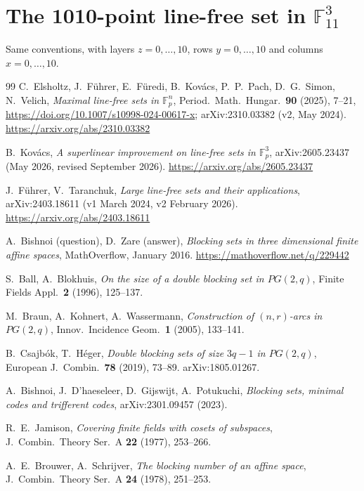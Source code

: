 \documentclass[11pt]{article}
\numberwithin{equation}{section}
\theoremstyle{definition}
\theoremstyle{remark}
\newcommand{\F}{\mathbb F}
\begin{document}
\section{The 1010-point line-free set in \texorpdfstring{$\F_{11}^3$}{F11^3}}\label{app:set11}
Same conventions, with layers $z=0,\dots,10$, rows $y=0,\dots,10$ and columns $x=0,\dots,10$.
{\footnotesize

}

\begin{thebibliography}{99}
C.~Elsholtz, J.~F\"uhrer, E.~F\"uredi, B.~Kov\'acs, P.~P.~Pach, D.~G.~Simon, N.~Velich,
\emph{Maximal line-free sets in $\mathbb F_p^n$}, Period.\ Math.\ Hungar.\ \textbf{90} (2025),
7--21, \url{https://doi.org/10.1007/s10998-024-00617-x}; arXiv:2310.03382 (v2, May 2024).
\url{https://arxiv.org/abs/2310.03382}

B.~Kov\'acs, \emph{A superlinear improvement on line-free sets in $\mathbb F_p^3$},
arXiv:2605.23437 (May 2026, revised September 2026). \url{https://arxiv.org/abs/2605.23437}

J.~F\"uhrer, V.~Taranchuk, \emph{Large line-free sets and their applications},
arXiv:2403.18611 (v1 March 2024, v2 February 2026). \url{https://arxiv.org/abs/2403.18611}

A.~Bishnoi (question), D.~Zare (answer), \emph{Blocking sets in three dimensional finite affine
spaces}, MathOverflow, January 2016. \url{https://mathoverflow.net/q/229442}

S.~Ball, A.~Blokhuis, \emph{On the size of a double blocking set in $PG(2,q)$},
Finite Fields Appl.\ \textbf{2} (1996), 125--137.

M.~Braun, A.~Kohnert, A.~Wassermann, \emph{Construction of $(n,r)$-arcs in $PG(2,q)$},
Innov.\ Incidence Geom.\ \textbf{1} (2005), 133--141.

B.~Csajb\'ok, T.~H\'eger, \emph{Double blocking sets of size $3q-1$ in $PG(2,q)$},
European J.\ Combin.\ \textbf{78} (2019), 73--89. arXiv:1805.01267.

A.~Bishnoi, J.~D'haeseleer, D.~Gijswijt, A.~Potukuchi, \emph{Blocking sets, minimal codes and
trifferent codes}, arXiv:2301.09457 (2023).

R.~E.~Jamison, \emph{Covering finite fields with cosets of subspaces},
J.\ Combin.\ Theory Ser.\ A \textbf{22} (1977), 253--266.

A.~E.~Brouwer, A.~Schrijver, \emph{The blocking number of an affine space},
J.\ Combin.\ Theory Ser.\ A \textbf{24} (1978), 251--253.
\end{thebibliography}
\end{document}
